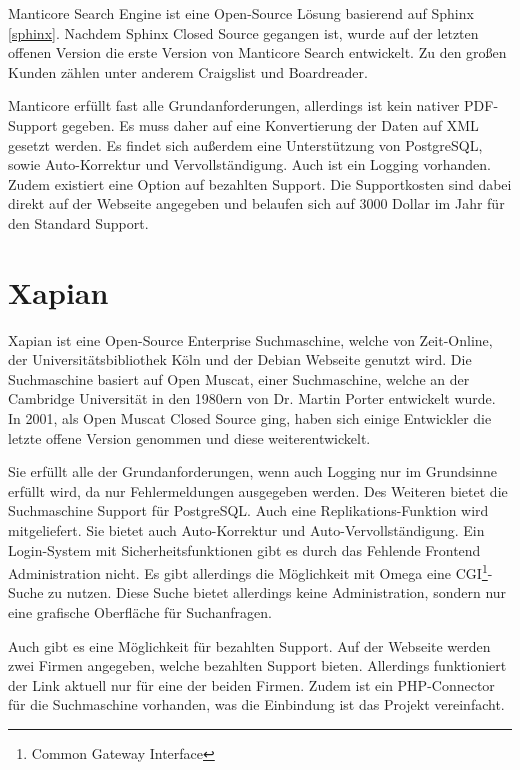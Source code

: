 Manticore Search Engine ist eine Open-Source Lösung basierend auf Sphinx \ref{sphinx}. Nachdem Sphinx Closed Source gegangen ist, wurde auf der letzten offenen Version die erste Version von Manticore Search entwickelt. Zu den großen Kunden zählen unter anderem Craigslist und Boardreader.

Manticore erfüllt fast alle Grundanforderungen, allerdings ist kein nativer PDF-Support gegeben. Es muss daher auf eine Konvertierung der Daten auf XML gesetzt werden. Es findet sich außerdem eine Unterstützung von PostgreSQL, sowie Auto-Korrektur und Vervollständigung. Auch ist ein Logging vorhanden. Zudem existiert eine Option auf bezahlten Support. Die Supportkosten sind dabei direkt auf der Webseite angegeben und belaufen sich auf 3000 Dollar im Jahr für den Standard Support. \cite{ManticoreSoftwareLtd.2019}

\section{Xapian}
\label{xapian}

Xapian ist eine Open-Source Enterprise Suchmaschine, welche von Zeit-Online, der Universitätsbibliothek Köln und der Debian Webseite genutzt wird. Die Suchmaschine basiert auf Open Muscat, einer Suchmaschine, welche an der Cambridge Universität in den 1980ern von Dr. Martin Porter entwickelt wurde. In 2001, als Open Muscat Closed Source ging, haben sich einige Entwickler die letzte offene Version genommen und diese weiterentwickelt.

Sie erfüllt alle der Grundanforderungen, wenn auch Logging nur im Grundsinne erfüllt wird, da nur Fehlermeldungen ausgegeben werden. Des Weiteren bietet die Suchmaschine Support für PostgreSQL. Auch eine Replikations-Funktion wird mitgeliefert. Sie bietet auch Auto-Korrektur und Auto-Vervollständigung. Ein Login-System mit Sicherheitsfunktionen gibt es durch das Fehlende Frontend Administration nicht. Es gibt allerdings die Möglichkeit mit Omega eine CGI\footnote{Common Gateway Interface}-Suche zu nutzen. Diese Suche bietet allerdings keine Administration, sondern nur eine grafische Oberfläche für Suchanfragen.

Auch gibt es eine Möglichkeit für bezahlten Support. Auf der Webseite werden zwei Firmen angegeben, welche bezahlten Support bieten. Allerdings funktioniert der Link aktuell nur für eine der beiden Firmen. Zudem ist ein PHP-Connector für die Suchmaschine vorhanden, was die Einbindung ist das Projekt vereinfacht. \cite{XAP.2019}


